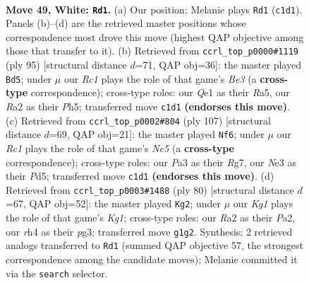 \documentclass[11pt]{article}
\begin{document}
\clearpage

\begin{figure}[p]\centering
\begin{subfigure}{0.46\textwidth}\centering
\resizebox{\linewidth}{!}{%
\newchessgame
\chessboard[
  setfen={r7/3n3k/1q6/1P1p3p/p6r/P3N3/R7/2R1Q1K1 w - - 4 49},
  showmover=false,
  pgfstyle=straightmove, color=movearrow, markmove={c1-d1}
]}
\caption{}
\end{subfigure}\hfill
\begin{subfigure}{0.46\textwidth}\centering
\resizebox{\linewidth}{!}{%
\newchessgame
\chessboard[
  setfen={8/1Qn3qk/2p1b1p1/r6p/P7/5RPP/5P2/4R1K1 b - - 1 48},
  showmover=false,
  pgfstyle=straightmove, color=movearrow, markmove={e6-d5}
]}
\caption{}
\end{subfigure}
\\[4pt]
\begin{subfigure}{0.46\textwidth}\centering
\resizebox{\linewidth}{!}{%
\newchessgame
\chessboard[
  setfen={6k1/6r1/pr6/3pNq2/3PnP1R/8/Q7/2R4K b - - 8 54},
  showmover=false,
  pgfstyle=straightmove, color=movearrow, markmove={e4-f6}
]}
\caption{}
\end{subfigure}\hfill
\begin{subfigure}{0.46\textwidth}\centering
\resizebox{\linewidth}{!}{%
\newchessgame
\chessboard[
  setfen={8/3r2k1/p4pn1/2q1p3/2P1P3/4NPp1/P7/1R2Q1K1 w - - 2 41},
  showmover=false,
  pgfstyle=straightmove, color=movearrow, markmove={g1-g2}
]}
\caption{}
\end{subfigure}
\caption{\textbf{Move 49, White: \texttt{Rd1}.} (a) Our position; Melanie plays \texttt{Rd1} (\texttt{c1d1}). Panels (b)--(d) are the retrieved master positions whose correspondence most drove this move (highest QAP objective among those that transfer to it). (b) Retrieved from \texttt{ccrl\_top\_p0000\#1119} (ply 95) [structural distance $d$=71, QAP obj=36]: the master played \texttt{Bd5}; under $\mu$ our \emph{Rc1} plays the role of that game's \emph{Be3} (a \textbf{cross-type} correspondence); cross-type roles: our \emph{Q}e1 as their \emph{R}a5, our \emph{R}a2 as their \emph{P}h5; transferred move \texttt{c1d1} \textbf{(endorses this move)}. (c) Retrieved from \texttt{ccrl\_top\_p0002\#804} (ply 107) [structural distance $d$=69, QAP obj=21]: the master played \texttt{Nf6}; under $\mu$ our \emph{Rc1} plays the role of that game's \emph{Ne5} (a \textbf{cross-type} correspondence); cross-type roles: our \emph{P}a3 as their \emph{R}g7, our \emph{N}e3 as their \emph{P}d5; transferred move \texttt{c1d1} \textbf{(endorses this move)}. (d) Retrieved from \texttt{ccrl\_top\_p0003\#1488} (ply 80) [structural distance $d$=67, QAP obj=52]: the master played \texttt{Kg2}; under $\mu$ our \emph{Kg1} plays the role of that game's \emph{Kg1}; cross-type roles: our \emph{R}a2 as their \emph{P}a2, our \emph{r}h4 as their \emph{p}g3; transferred move \texttt{g1g2}. Synthesis: 2 retrieved analogs transferred to \texttt{Rd1} (summed QAP objective 57, the strongest correspondence among the candidate moves); Melanie committed it via the \texttt{search} selector.}
\label{fig:thought-m96}
\end{figure}
\end{document}
